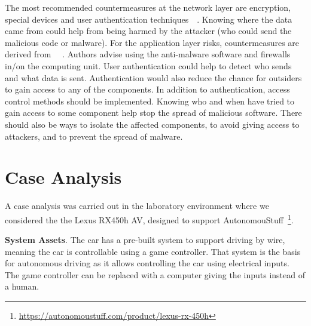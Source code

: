 \documentclass[runningheads]{llncs}
\begin{document}
The most recommended countermeasures at the network layer are encryption, special devices and user authentication techniques~\cite{ThingEtAL2016}~\cite{ScalasEtAl2019}. Knowing where the data came from could help from being harmed by the attacker (who could send the malicious code or malware). For the application layer risks, countermeasures are derived from ~\cite{ThingEtAL2016}~\cite{ScalasEtAl2019}. Authors advise using the anti-malware software and firewalls in/on the computing unit. User authentication could help to detect who sends and what data is sent. Authentication would also reduce the chance for outsiders to gain access to any of the components. In addition to authentication, access control methods should be implemented. Knowing who and when have tried to gain access to some component help stop the spread of malicious software. There should also be ways to isolate the affected components, to avoid giving access to attackers, and to prevent the spread of malware.


\section{Case Analysis}
\label{sec:case}

 A case analysis was carried out in the laboratory environment where we considered the the Lexus RX450h AV, designed to support AutonomouStuff~\footnote{\url{https://autonomoustuff.com/product/lexus-rx-450h}}. %
 
\textbf{System Assets}. The car has a pre-built system to support driving by wire, meaning the car is controllable using a game controller. That system is the basis for autonomous driving as it allows controlling the car using electrical inputs. The game controller can be replaced with a computer giving the inputs instead of a human. 
\end{document}
